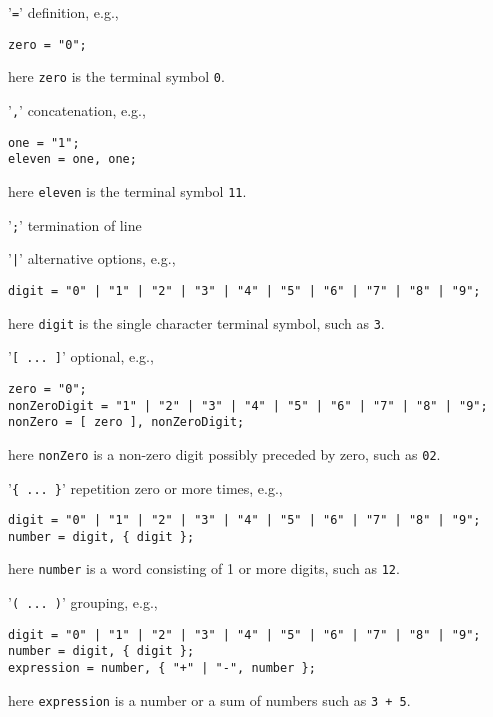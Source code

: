 \begin{description}
\item '\lstinline[language=ebnf]|=|' definition, e.g., 
  \begin{lstlisting}[language=ebnf]
zero = "0";
  \end{lstlisting}
  here \lstinline[language=ebnf]|zero| is the terminal symbol \lstinline[language=ebnf]|0|.
\item '\lstinline[language=ebnf]|,|' concatenation, e.g.,
  \begin{lstlisting}[language=ebnf]
one = "1";
eleven = one, one;
  \end{lstlisting}
  here \lstinline[language=ebnf]|eleven| is the terminal symbol \lstinline[language=ebnf]|11|.
\item '\lstinline[language=ebnf]|;|' termination of line
\item '\lstinline[language=ebnf]!|!' alternative options, e.g.,
  \begin{lstlisting}[language=ebnf]
digit = "0" | "1" | "2" | "3" | "4" | "5" | "6" | "7" | "8" | "9";
  \end{lstlisting}
  here \lstinline[language=ebnf]|digit| is the single character terminal symbol, such as \lstinline[language=ebnf]|3|.
\item '\lstinline[language=ebnf]|[ ... ]|' optional, e.g.,
  \begin{lstlisting}[language=ebnf]
zero = "0";
nonZeroDigit = "1" | "2" | "3" | "4" | "5" | "6" | "7" | "8" | "9";
nonZero = [ zero ], nonZeroDigit;
  \end{lstlisting}
  here \lstinline[language=ebnf]|nonZero| is a non-zero digit possibly preceded by zero, such as \lstinline[language=ebnf]|02|.
\item '\lstinline[language=ebnf]|{ ... }|' repetition zero or more times, e.g., 
  \begin{lstlisting}[language=ebnf]
digit = "0" | "1" | "2" | "3" | "4" | "5" | "6" | "7" | "8" | "9";
number = digit, { digit };
  \end{lstlisting}
  here \lstinline[language=ebnf]|number| is a word consisting of 1 or more digits, such as \lstinline[language=ebnf]|12|.
\item '\lstinline[language=ebnf]|( ... )|' grouping, e.g.,
  \begin{lstlisting}[language=ebnf]
digit = "0" | "1" | "2" | "3" | "4" | "5" | "6" | "7" | "8" | "9";
number = digit, { digit };
expression = number, { "+" | "-", number };
  \end{lstlisting}
  here \lstinline[language=ebnf]|expression| is a number or a sum of numbers such as \lstinline[language=ebnf]|3 + 5|.

\end{description}

